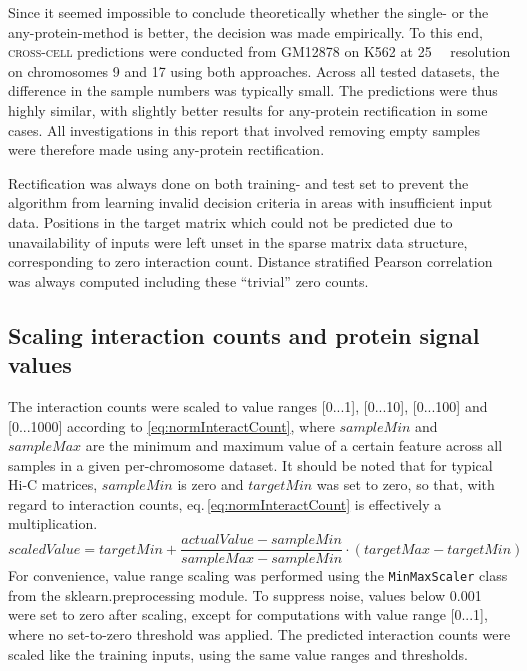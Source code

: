 Since it seemed impossible to conclude theoretically whether the single- or the any-protein-method is better, 
the decision was made empirically.
To this end, \textsc{cross-cell} predictions were conducted from GM12878 on K562 at \SI{25}{\kilo\bp} resolution 
on chromosomes 9 and 17 using both approaches.
Across all tested datasets, the difference in the sample numbers was typically small.
The predictions were thus highly similar, with slightly better results for any-protein rectification in some cases.
All investigations in this report that involved removing empty samples were therefore made using any-protein rectification.

Rectification was always done on both training- and test set 
to prevent the algorithm from learning invalid decision criteria
in areas with insufficient input data.
Positions in the target matrix which could not be predicted due to unavailability of inputs
were left unset in the sparse matrix data structure, corresponding to zero interaction count.
Distance stratified Pearson correlation was always computed including these ``trivial'' zero counts.

\subsection{Scaling interaction counts and protein signal values} \label{sec:methods:normalization}
The interaction counts were scaled to value ranges [0...1], [0...10], [0...100] and [0...1000] 
according to \autoref{eq:normInteractCount}, 
where $sampleMin$ and $sampleMax$ are the minimum and maximum value of a certain feature 
across all samples in a given per-chromosome dataset.
It should be noted that for typical Hi-C matrices, $sampleMin$ is zero and $targetMin$ was
set to zero, so that, with regard to interaction counts, eq.\,\ref{eq:normInteractCount} is effectively a multiplication.
\begin{equation}\label{eq:normInteractCount}
 scaledValue = targetMin + \frac{actualValue - sampleMin}{sampleMax - 
sampleMin} \cdot (targetMax - targetMin)
\end{equation}
For convenience, value range scaling was performed using the \texttt{MinMaxScaler} class from
the sklearn.preprocessing module.
To suppress noise, values below 0.001 were set to zero after scaling, 
except for computations with value range [0...1], where no set-to-zero threshold was applied.
The predicted interaction counts were scaled like the training inputs, using the same value ranges and thresholds.

